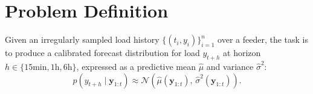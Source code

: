 \section{Problem Definition}
Given an irregularly sampled load history $\{(t_i, y_i)\}_{i=1}^{n}$ over a feeder, the task
is to produce a calibrated forecast distribution for load $y_{t+h}$ at horizon
$h \in \{15\text{min}, 1\text{h}, 6\text{h}\}$, expressed as a predictive mean $\hat{\mu}$ and
variance $\hat{\sigma}^2$:
\begin{equation}
\label{eq:objective}
p(y_{t+h} \mid \mathbf{y}_{1:t}) \approx \mathcal{N}\!\left(\hat{\mu}(\mathbf{y}_{1:t}),\,
\hat{\sigma}^2(\mathbf{y}_{1:t})\right).
\end{equation}
